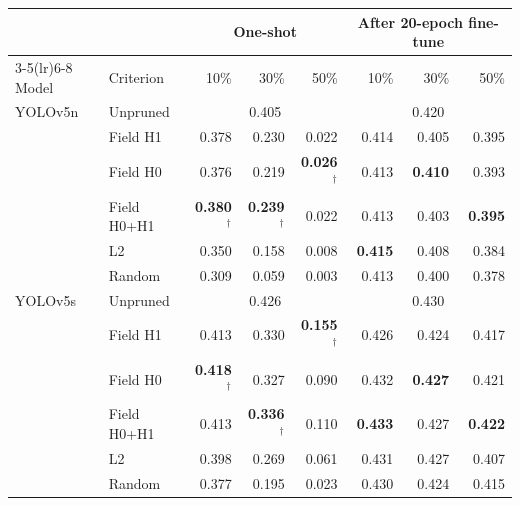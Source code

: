 \begin{tabular}{llrrrrrr}
\toprule
 & & \multicolumn{3}{c}{One-shot} & \multicolumn{3}{c}{After 20-epoch fine-tune} \\
\cmidrule(lr){3-5}\cmidrule(lr){6-8}
Model & Criterion & 10\% & 30\% & 50\% & 10\% & 30\% & 50\% \\
\midrule
YOLOv5n & Unpruned & \multicolumn{3}{c}{0.405} & \multicolumn{3}{c}{0.420} \\
 & Field H1 & 0.378 & 0.230 & 0.022 & 0.414 & 0.405 & 0.395 \\
 & Field H0 & 0.376 & 0.219 & \textbf{0.026}$^\dagger$ & 0.413 & \textbf{0.410} & 0.393 \\
 & Field H0+H1 & \textbf{0.380}$^\dagger$ & \textbf{0.239}$^\dagger$ & 0.022 & 0.413 & 0.403 & \textbf{0.395} \\
 & L2 & 0.350 & 0.158 & 0.008 & \textbf{0.415} & 0.408 & 0.384 \\
 & Random & 0.309 & 0.059 & 0.003 & 0.413 & 0.400 & 0.378 \\
\midrule
YOLOv5s & Unpruned & \multicolumn{3}{c}{0.426} & \multicolumn{3}{c}{0.430} \\
 & Field H1 & 0.413 & 0.330 & \textbf{0.155}$^\dagger$ & 0.426 & 0.424 & 0.417 \\
 & Field H0 & \textbf{0.418}$^\dagger$ & 0.327 & 0.090 & 0.432 & \textbf{0.427} & 0.421 \\
 & Field H0+H1 & 0.413 & \textbf{0.336}$^\dagger$ & 0.110 & \textbf{0.433} & 0.427 & \textbf{0.422} \\
 & L2 & 0.398 & 0.269 & 0.061 & 0.431 & 0.427 & 0.407 \\
 & Random & 0.377 & 0.195 & 0.023 & 0.430 & 0.424 & 0.415 \\
\bottomrule
\end{tabular}
